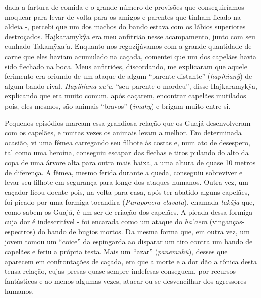 dada a fartura de comida e o grande número de provisões que
conseguiríamos moquear para levar de volta para os amigos e parentes que
tinham ficado na aldeia -, percebi que um dos machos do bando estava com
os lábios superiores destroçados. Hajkaramykỹa era meu anfitrião nesse
acampamento, junto com seu cunhado Takamỹxa'a. Enquanto nos
regozijávamos com a grande quantidade de carne que eles haviam acumulado
na caçada, comentei que um dos capelães havia sido flechado na boca.
Meus anfitriões, discordando, me explicaram que aquele ferimento era
oriundo de um ataque de algum ``parente distante'' (\emph{hapihianỹ}) de
algum bando rival. \emph{Hapihiana xu'u}, ``seu parente o mordeu'',
disse Hajkaramykỹa, explicando que era muito comum, após caçarem,
encontrar capelães mutilados pois, eles mesmos, são animais ``bravos''
(\emph{imahy}) e brigam muito entre si.

Pequenos episódios marcam essa grandiosa relação que os Guajá
desenvolveram com os capelães, e muitas vezes os animais levam a melhor.
Em determinada ocasião, vi uma fêmea carregando seu filhote às costas e,
num ato de desespero, tal como uma heroína, conseguiu escapar das
flechas e tiros pulando do alto da copa de uma árvore alta para outra
mais baixa, a uma altura de quase 10 metros de diferença. A fêmea, mesmo
ferida durante a queda, conseguiu sobreviver e levar seu filhote em
segurança para longe dos ataques humanos. Outra vez, um caçador ficou
doente pois, na volta para casa, após ter abatido alguns capelães, foi
picado por uma formiga tocandira (\emph{Paraponera clavata}), chamada
\emph{takãja} que, como sabem os Guajá, é um ser de criação dos
capelães. A picada dessa formiga - cuja dor é indescritível - foi
encarada como um ataque do \emph{ha'aera} (vinganças-espectros) do bando
de bugios mortos. Da mesma forma que, em outra vez, um jovem tomou um
``coice'' da espingarda ao disparar um tiro contra um bando de capelães
e feriu a própria testa. Mais um ``azar'' (\emph{panemuhũ}), desses que
aparecem em confrontações de caçada, em que a morte e a dor dão a tônica
desta tensa relação, cujas presas quase sempre indefesas conseguem, por
recursos fantásticos e ao menos algumas vezes, atacar ou se desvencilhar
dos agressores humanos.

